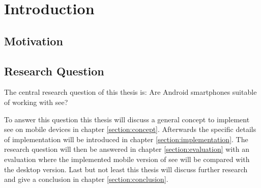\section{Introduction}
\subsection{Motivation}
\subsection{Research Question}
\label{research}
The central research question of this thesis is: Are Android smartphones suitable of working with \gls{see}?

To answer this question this thesis will discuss a general concept to implement \gls{see} on mobile devices in chapter \ref{section:concept}.
Afterwards the specific details of implementation will be introduced in chapter \ref{section:implementation}. 
The research question will then be answered in chapter \ref{section:evaluation} with an evaluation where the implemented mobile version of \gls{see} will be compared with the desktop version.
Last but not least this thesis will discuss further research and give a conclusion in chapter \ref{section:conclusion}.